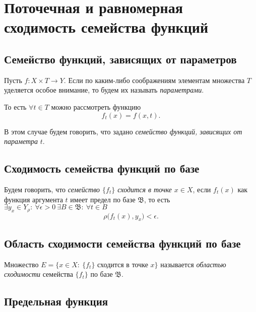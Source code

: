 \section{Поточечная и равномерная сходимость семейства функций}

\setcounter{subsection}{42}

\subsection{Семейство функций, зависящих от параметров}

\begin{definition}
    Пусть $f:X\times T \rightarrow Y$. Если по каким-либо соображениям элементам множества $T$ уделяется особое внимание, то будем их называть \emph{параметрами}.

    То есть $\forall t \in T$ можно рассмотреть функцию
    \[
        f_t(x) = f(x,t).
    \]

    В этом случае будем говорить, что задано \emph{семейство функций, зависящих от параметра} $t$.
\end{definition}

\subsection{Сходимость семейства функций по базе}

\begin{definition}
    Будем говорить, что \emph{семейство $\{f_t\}$ сходится в точке $x \in X$}, если $f_t(x)$ как функция аргумента $t$ имеет предел по базе $\mathfrak{B}$, то есть $\exists y_x \in Y_\rho: \ \forall \epsilon > 0 \ \exists B \in \mathfrak{B}: \ \forall t \in B$
    \[
        \rho\big(f_t(x),y_x\big) < \epsilon.
    \]
\end{definition}

\subsection{Область сходимости семейства функций по базе}

\begin{definition}
    Множество $E = \big\{x \in X : \ \{f_t\}$ сходится в точке $x\big\}$ называется \emph{областью сходимости} семейства $\{f_t\}$ по базе $\mathfrak{B}$.
\end{definition}

\subsection{Предельная функция}

